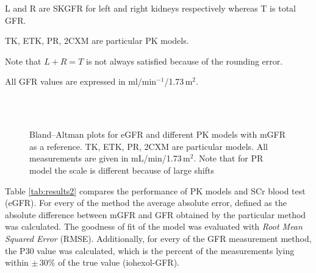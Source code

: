 \begin{landscape}
\begin{table}[H]
\begin{threeparttable}
\begin{tabular}
  \bottomrule

\end{tabular}
\begin{tablenotes}%
\footnotesize{}%
\item L and R are SKGFR for left and right kidneys respectively whereas T is total GFR.
\item TK, ETK, PR, 2CXM are particular PK models. 
\item Note that $L+R = T$ is not always satisfied because of the rounding error.
\item All GFR values are expressed in ml/min$^{-1}$/1.73\,m$^2$.
    \end{tablenotes}
	\end{threeparttable}
\end{table}
\end{landscape}


\begin{figure}[H]
	\centering
	 \\ \vspace{10pt}  
 	 \hfill {} \\ \vspace{10pt}   
	 \hfill {}
\caption[Bland–Altman plots for different methods]{Bland–Altman plots for eGFR and different PK models with mGFR as a reference. TK, ETK, PR, 2CXM are particular models. All measurements are given in mL/min/1.73\,m$^2$. Note that for PR model the scale is different because of large shifts} 
\label{fig:baltman}
\end{figure}

Table \ref{tab:results2} compares the performance of PK models and SCr blood test (eGFR). For every of the method the average absolute error, defined as the absolute difference between mGFR and GFR obtained by the particular method was calculated.
The goodness of fit of the model was evaluated with \textit{Root Mean Squared Error} (RMSE). 
Additionally, for every of the GFR measurement method, the P30 value was calculated, which is the percent of the measurements lying within $\pm\,30\%$ of the true value (iohexol-GFR).

